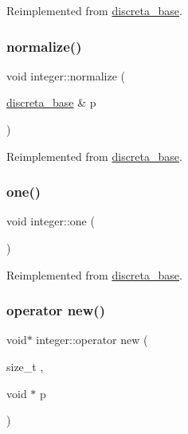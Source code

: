 Reimplemented from \mbox{\hyperlink{classdiscreta__base_a65ad2034f2f4518d424b814974018a03}{discreta\+\_\+base}}.

\mbox{\label{classinteger_aac4272bbf32a3e1b4a5201630f116388}} 
\subsubsection{\texorpdfstring{normalize()}{normalize()}}
{\footnotesize\ttfamily void integer\+::normalize (\begin{DoxyParamCaption}\item[{\mbox{\hyperlink{classdiscreta__base}{discreta\+\_\+base}} \&}]{p }\end{DoxyParamCaption})\hspace{0.3cm}{\ttfamily [virtual]}}



Reimplemented from \mbox{\hyperlink{classdiscreta__base_acd46a488505c6086b5bc019550e5e313}{discreta\+\_\+base}}.

\mbox{\label{classinteger_a18a967d90d63b1c58e3f2480e9084ed5}} 
\subsubsection{\texorpdfstring{one()}{one()}}
{\footnotesize\ttfamily void integer\+::one (\begin{DoxyParamCaption}{ }\end{DoxyParamCaption})\hspace{0.3cm}{\ttfamily [virtual]}}



Reimplemented from \mbox{\hyperlink{classdiscreta__base_a6f5d6422a0040950415db30e39dafd19}{discreta\+\_\+base}}.

\mbox{\label{classinteger_ab23c39901803e33fb3b52be1476ec54a}} 
\subsubsection{\texorpdfstring{operator new()}{operator new()}}
{\footnotesize\ttfamily void$\ast$ integer\+::operator new (\begin{DoxyParamCaption}\item[{size\+\_\+t}]{,  }\item[{void $\ast$}]{p }\end{DoxyParamCaption})\hspace{0.3cm}{\ttfamily [inline]}}

